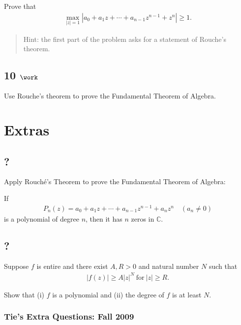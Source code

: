 Prove that
\begin{align*}
\max_{{\left\lvert {z} \right\rvert} = 1} {\left\lvert {a_0 + a_1 z + \cdots + a_{n-1}z^{n-1} + z^n} \right\rvert} \geq 1
.\end{align*}

\begin{quote}
Hint: the first part of the problem asks for a statement of Rouche's
theorem.
\end{quote}

\hypertarget{work-69}{%
\subsection{\texorpdfstring{10
\(\work\)}{10 \textbackslash work}}\label{work-69}}

Use Rouche's theorem to prove the Fundamental Theorem of Algebra.

\hypertarget{extras}{%
\section{Extras}\label{extras}}

\hypertarget{section-4}{%
\subsection{?}\label{section-4}}

Apply Rouché's Theorem to prove the Fundamental Theorem of Algebra:

If
\begin{align*}
P_n(z) = a_0 + a_1z + \cdots + a_{n-1}z^{n-1} + a_nz^n\quad  (a_n \neq 0)
\end{align*}
is a polynomial of degree \(n\), then it has \(n\) zeros in
\(\mathbb{C}\).

\hypertarget{section-5}{%
\subsection{?}\label{section-5}}

Suppose \(f\) is entire and there exist \(A, R >0\) and natural number
\(N\) such that
\begin{align*}|f(z)| \geq A |z|^N\ \text{for}\ |z| \geq R.\end{align*}

Show that (i) \(f\) is a polynomial and (ii) the degree of \(f\) is at
least \(N\).

\hypertarget{ties-extra-questions-fall-2009-9}{%
\subsubsection{Tie's Extra Questions: Fall
2009}\label{ties-extra-questions-fall-2009-9}}

